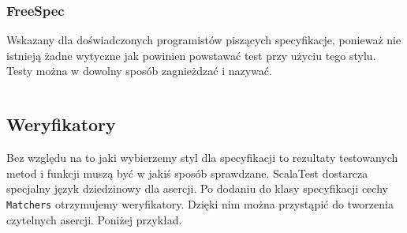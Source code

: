 \documentclass[wimgr]{xmgr}
\begin{document}
\inputminted[fontsize=\small]{scala}{code/WordSpec.scala}

\subsubsection{FreeSpec}

Wskazany dla doświadczonych programistów piszących specyfikacje, ponieważ nie istnieją żadne wytyczne jak powinien powstawać test przy użyciu tego stylu. Testy można w dowolny sposób zagnieżdzać i nazywać.

\inputminted[fontsize=\small]{scala}{code/FreeSpec.scala}


\subsection{Weryfikatory}

\label{weryfikatory}

Bez względu na to jaki wybierzemy styl dla specyfikacji to rezultaty testowanych metod i funkcji muszą być w jakiś sposób sprawdzane. ScalaTest dostarcza specjalny język dziedzinowy dla asercji. Po dodaniu do klasy specyfikacji cechy \texttt{Matchers} otrzymujemy weryfikatory. Dzięki nim można przystąpić do tworzenia czytelnych asercji. Poniżej przykład.
\end{document}
